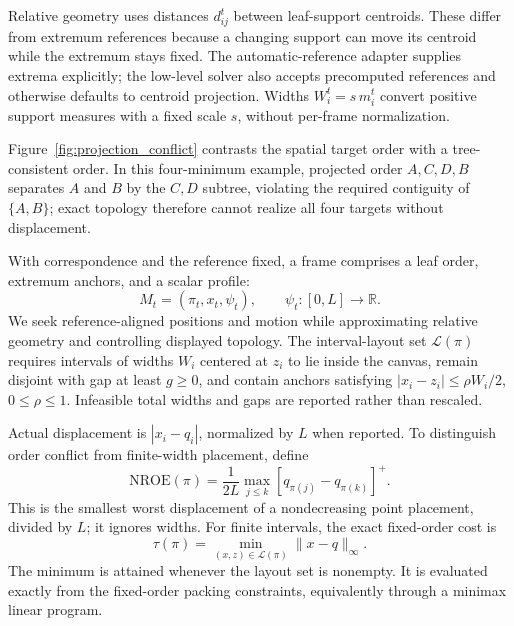 \documentclass[review]{vgtc}
\newcommand{\nroe}{\mathrm{NROE}}
\begin{document}
Relative geometry uses distances $d_{ij}^t$ between leaf-support centroids. These differ from extremum references because a changing support can move its centroid while the extremum stays fixed. The automatic-reference adapter supplies extrema explicitly; the low-level solver also accepts precomputed references and otherwise defaults to centroid projection. Widths $W_i^t=s\,m_i^t$ convert positive support measures with a fixed scale $s$, without per-frame normalization.

Figure~\ref{fig:projection_conflict} contrasts the spatial target order with a tree-consistent order. In this four-minimum example, projected order $A,C,D,B$ separates $A$ and $B$ by the $C,D$ subtree, violating the required contiguity of $\{A,B\}$; exact topology therefore cannot realize all four targets without displacement.



With correspondence and the reference fixed, a frame comprises a leaf order, extremum anchors, and a scalar profile:
\begin{equation}\label{eq:mapframe}
 M_t=(\pi_t,x_t,\psi_t),\qquad\psi_t:[0,L]\to\mathbb{R}.
\end{equation}
We seek reference-aligned positions and motion while approximating relative geometry and controlling displayed topology. The interval-layout set $\mathcal{L}(\pi)$ requires intervals of widths $W_i$ centered at $z_i$ to lie inside the canvas, remain disjoint with gap at least $g\ge0$, and contain anchors satisfying $|x_i-z_i|\le\rho W_i/2$, $0\le\rho\le1$. Infeasible total widths and gaps are reported rather than rescaled.

Actual displacement is $|x_i-q_i|$, normalized by $L$ when reported. To distinguish order conflict from finite-width placement, define
\begin{equation}\label{eq:nroe}
 \nroe(\pi)=\frac{1}{2L}\max_{j\le k}
                      [q_{\pi(j)}-q_{\pi(k)}]^+.
\end{equation}
This is the smallest worst displacement of a nondecreasing point placement, divided by $L$; it ignores widths. For finite intervals, the exact fixed-order cost is
\begin{equation}\label{eq:tau}
 \tau(\pi)=\min_{(x,z)\in\mathcal{L}(\pi)}\|x-q\|_\infty.
\end{equation}
The minimum is attained whenever the layout set is nonempty. It is evaluated exactly from the fixed-order packing constraints, equivalently through a minimax linear program.
\end{document}
